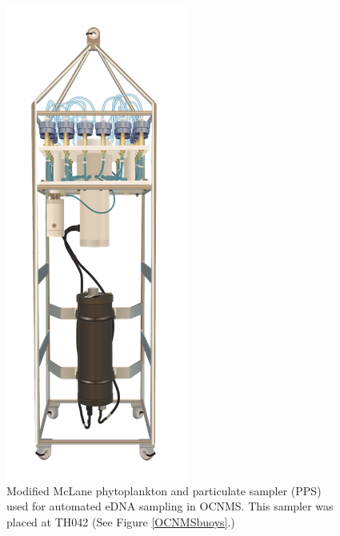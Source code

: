 \documentclass[12pt,twoside]{reedthesis}
\begin{document}
\begin{figure}
	\centering
	\begin{minipage}{0.4\textwidth}
		\centering
		\includegraphics[width=0.7\linewidth]{Fig_PPS}
		\caption[Automated eDNA Sampler]{\footnotesize{Modified McLane phytoplankton and particulate sampler (PPS) used for automated eDNA sampling in OCNMS. This sampler was placed at TH042 (See Figure \ref{OCNMSbuoys}.)}}
		\label{PPS}
	\end{minipage}

\end{figure}
\end{document}
